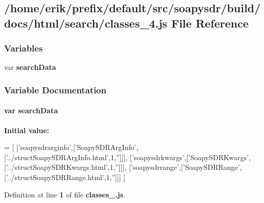 \subsection{/home/erik/prefix/default/src/soapysdr/build/docs/html/search/classes\+\_\+4.js File Reference}
\label{classes__4_8js}
\subsubsection*{Variables}
\begin{DoxyCompactItemize}
\item 
var {\bf search\+Data}
\end{DoxyCompactItemize}


\subsubsection{Variable Documentation}
\paragraph[{search\+Data}]{\setlength{\rightskip}{0pt plus 5cm}var search\+Data}\label{classes__4_8js_ad01a7523f103d6242ef9b0451861231e}
{\bfseries Initial value\+:}
\begin{DoxyCode}
=
[
  [\textcolor{stringliteral}{'soapysdrarginfo'},[\textcolor{stringliteral}{'SoapySDRArgInfo'},[\textcolor{stringliteral}{'../structSoapySDRArgInfo.html'},1,\textcolor{stringliteral}{''}]]],
  [\textcolor{stringliteral}{'soapysdrkwargs'},[\textcolor{stringliteral}{'SoapySDRKwargs'},[\textcolor{stringliteral}{'../structSoapySDRKwargs.html'},1,\textcolor{stringliteral}{''}]]],
  [\textcolor{stringliteral}{'soapysdrrange'},[\textcolor{stringliteral}{'SoapySDRRange'},[\textcolor{stringliteral}{'../structSoapySDRRange.html'},1,\textcolor{stringliteral}{''}]]]
]
\end{DoxyCode}


Definition at line {\bf 1} of file {\bf classes\+\_.\+js}.

